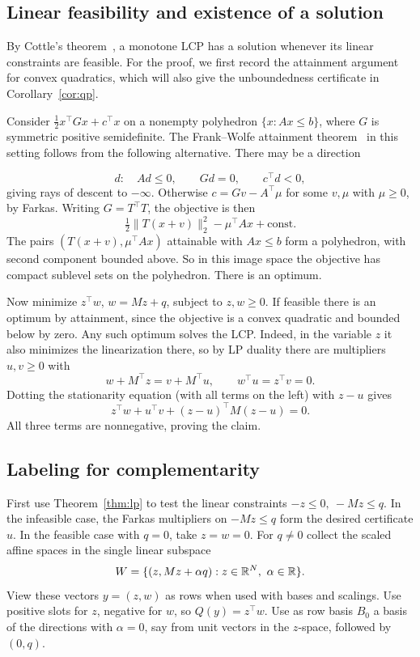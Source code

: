 \subsection{Linear feasibility and existence of a solution}

By Cottle's theorem~\cite{Cottle}, a monotone LCP has a solution
whenever its linear constraints are feasible. For the proof, we first
record the attainment argument for convex quadratics, which will also
give the unboundedness certificate in Corollary~\ref{cor:qp}.

Consider \(\tfrac12 x^\top Gx+c^\top x\) on a nonempty polyhedron
\(\{x:Ax\le b\}\), where \(G\) is symmetric positive semidefinite.
The Frank--Wolfe attainment theorem~\cite{FW} in this setting follows
from the following alternative. There may be a direction

\begin{equation}\label{eq:baddir}
 d:\quad Ad\le0,\qquad Gd=0,\qquad c^\top d<0,
\end{equation}
giving rays of descent to \(-\infty\). Otherwise
\(c=Gv-A^\top\mu\) for some \(v,\mu\) with \(\mu\ge0\), by Farkas.
Writing \(G=T^\top T\), the objective is then
\[
 \tfrac12\|T(x+v)\|_2^2-\mu^\top Ax+\mathrm{const}.
\]
The pairs \((T(x+v),\mu^\top Ax)\) attainable with \(Ax\le b\)
form a polyhedron, with second component bounded above.
So in this image space the objective has compact sublevel sets
on the polyhedron. There is an optimum.


Now minimize
\(z^\top w\), \(w=Mz+q\), subject to \(z,w\ge0\).
If feasible there is an optimum by attainment, since the objective
is a convex quadratic and bounded below by zero.
Any such optimum solves the LCP. Indeed, in the variable \(z\)
it also minimizes the linearization there, so by LP duality
there are multipliers \(u,v\ge0\) with
\[
 w+M^\top z=v+M^\top u,\qquad w^\top u=z^\top v=0.
\]
Dotting the stationarity equation (with all terms on the left)
with \(z-u\) gives
\[
 z^\top w+u^\top v+(z-u)^\top M(z-u)=0.
\]
All three terms are nonnegative, proving the claim.

\subsection{Labeling for complementarity}

First use Theorem~\ref{thm:lp} to test the linear constraints
\(-z\le0,\ -Mz\le q\). In the infeasible case, the Farkas
multipliers on \(-Mz\le q\) form the desired certificate \(u\).
In the feasible case with \(q=0\), take \(z=w=0\). For \(q\ne0\)
collect the scaled affine spaces in the single linear subspace
\[
 W=\{(z,Mz+\alpha q):z\in\RR^N,\ \alpha\in\RR\}.
\]
View these vectors \(y=(z,w)\) as rows when used with bases
and scalings. Use positive slots for \(z\), negative for \(w\),
so \(Q(y)=z^\top w\). Use as row basis \(B_0\)
a basis of the directions with \(\alpha=0\), say from unit vectors
in the \(z\)-space, followed by \((0,q)\).


